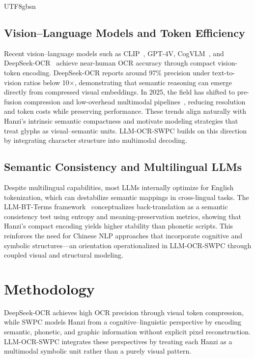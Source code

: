 \documentclass[conference]{IEEEtran}
\begin{document}
\begin{CJK*}{UTF8}{gbsn}
\subsection{Vision--Language Models and Token Efficiency}

Recent vision--language models such as CLIP~\cite{radford2021learning}, GPT-4V, CogVLM~\cite{wang2024cogvlm}, and DeepSeek-OCR~\cite{wei2025deepseek} achieve near-human OCR accuracy through compact vision-token encoding. DeepSeek-OCR reports around 97\% precision under text-to-vision ratios below 10×, demonstrating that semantic reasoning can emerge directly from compressed visual embeddings. In 2025, the field has shifted to pre-fusion compression and low-overhead multimodal pipelines~\cite{zhang2025llava,lu2025internvl,bai2025qwen2}, reducing resolution and token costs while preserving performance. These trends align naturally with Hanzi’s intrinsic semantic compactness and motivate modeling strategies that treat glyphs as visual–semantic units. LLM-OCR-SWPC builds on this direction by integrating character structure into multimodal decoding.

\subsection{Semantic Consistency and Multilingual LLMs}

Despite multilingual capabilities, most LLMs internally optimize for English tokenization, which can destabilize semantic mappings in cross-lingual tasks. The LLM-BT-Terms framework~\cite{weigang2025paradox,weigang2025llm} conceptualizes back-translation as a semantic consistency test using entropy and meaning-preservation metrics, showing that Hanzi’s compact encoding yields higher stability than phonetic scripts. This reinforces the need for Chinese NLP approaches that incorporate cognitive and symbolic structures—an orientation operationalized in LLM-OCR-SWPC through coupled visual and structural modeling.

\section{Methodology}
\label{sec:methodology}

DeepSeek-OCR \cite{wei2025deepseek} achieves high OCR precision through visual token compression, while SWPC models Hanzi from a cognitive–linguistic perspective by encoding semantic, phonetic, and graphic information without explicit pixel reconstruction. LLM-OCR-SWPC integrates these perspectives by treating each Hanzi as a multimodal symbolic unit rather than a purely visual pattern.


\end{CJK*}
\end{document}
